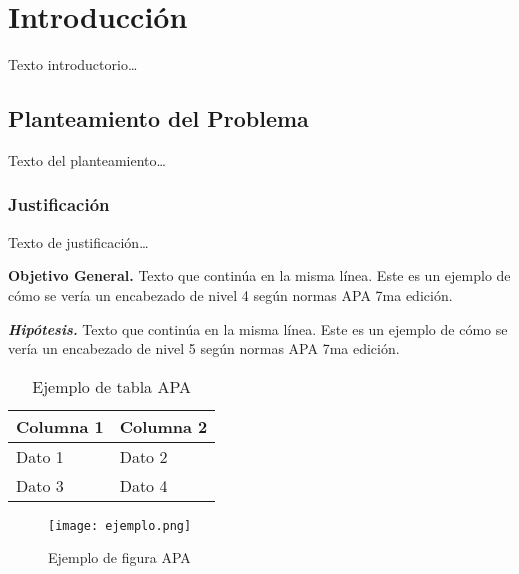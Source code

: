 \documentclass[stu, 12pt, letterpaper,]{apa7}
\newcommand{\nivelcuatro}[1]{
  \noindent
  \hangindent=1.27cm
  \textbf{#1.}\space
}
\newcommand{\nivelcinco}[1]{
  \noindent
  \hangindent=1.27cm
  \textbf{\textit{#1.}}\space
}
\begin{document}
\chapter{Introducción} %
Texto introductorio\ldots

\section{Planteamiento del Problema} %
Texto del planteamiento\ldots

\subsection{Justificación} %
Texto de justificación\ldots

\nivelcuatro{Objetivo General} %
Texto que continúa en la misma línea. Este es un ejemplo de cómo se vería un encabezado de nivel 4 según normas APA 7ma edición.

\nivelcinco{Hipótesis} %
Texto que continúa en la misma línea. Este es un ejemplo de cómo se vería un encabezado de nivel 5 según normas APA 7ma edición.

\begin{table}[h]
\centering
\caption{Ejemplo de tabla APA}
\begin{tabular}{ll}
\toprule
Columna 1 & Columna 2 \\
\midrule
Dato 1 & Dato 2 \\
Dato 3 & Dato 4 \\
\bottomrule
\end{tabular}
\end{table}

\begin{figure}[h]
\centering
\texttt{[image: ejemplo.png]}
\caption{Ejemplo de figura APA}\label{fig:ejemplo}%
\end{figure}

\backmatter%

\end{document}
